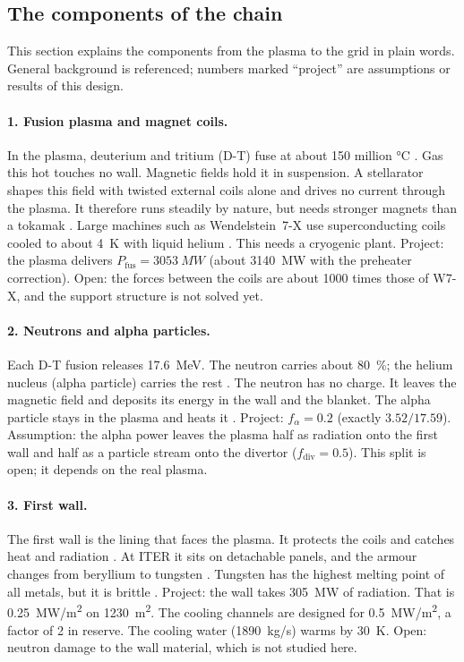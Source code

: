 \subsection{The components of the chain}\label{sec:components}
This section explains the components from the plasma to the grid in plain words. General background is referenced; numbers marked ``project'' are assumptions or results of this design.

\paragraph{1. Fusion plasma and magnet coils.} In the plasma, deuterium and tritium (D-T) fuse at about 150 million \si{\celsius} \cite{bt_iter_fusion}. Gas this hot touches no wall. Magnetic fields hold it in suspension. A stellarator shapes this field with twisted external coils alone and drives no current through the plasma. It therefore runs steadily by nature, but needs stronger magnets than a tokamak \cite{bt_stellarator}. Large machines such as Wendelstein~7-X use superconducting coils cooled to about \SI{4}{K} with liquid helium \cite{bt_w7x_en}. This needs a cryogenic plant. Project: the plasma delivers $P_\text{fus} = \SI{3053}{MW}$ (about \SI{3140}{MW} with the preheater correction). Open: the forces between the coils are about 1000 times those of W7-X, and the support structure is not solved yet.

\paragraph{2. Neutrons and alpha particles.} Each D-T fusion releases \SI{17.6}{MeV}. The neutron carries about \SI{80}{\percent}; the helium nucleus (alpha particle) carries the rest \cite{bt_dtfusion,bt_fusionpower}. The neutron has no charge. It leaves the magnetic field and deposits its energy in the wall and the blanket. The alpha particle stays in the plasma and heats it \cite{bt_tokamak}. Project: $f_\alpha = 0.2$ (exactly $3.52/17.59$). Assumption: the alpha power leaves the plasma half as radiation onto the first wall and half as a particle stream onto the divertor ($f_\text{div} = 0.5$). This split is open; it depends on the real plasma.

\paragraph{3. First wall.} The first wall is the lining that faces the plasma. It protects the coils and catches heat and radiation \cite{bt_firstwall}. At ITER it sits on detachable panels, and the armour changes from beryllium to tungsten \cite{bt_iter_blanket}. Tungsten has the highest melting point of all metals, but it is brittle \cite{bt_firstwall}. Project: the wall takes \SI{305}{MW} of radiation. That is \SI{0.25}{MW/m^2} on \SI{1230}{m^2}. The cooling channels are designed for \SI{0.5}{MW/m^2}, a factor of 2 in reserve. The cooling water (\SI{1890}{kg/s}) warms by \SI{30}{K}. Open: neutron damage to the wall material, which is not studied here.

